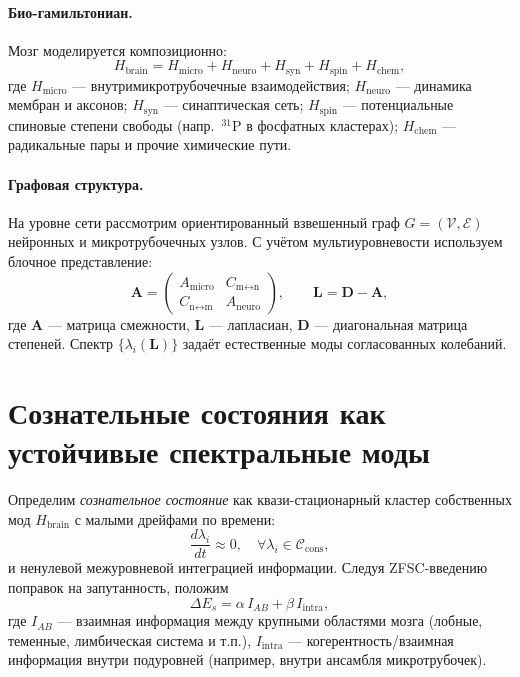 \documentclass[12pt,a4paper]{article}
\begin{document}
\paragraph{Био-гамильтониан.}
Мозг моделируется композиционно:
\begin{equation}
H_{\text{brain}} = H_{\text{micro}} + H_{\text{neuro}} + H_{\text{syn}} + H_{\text{spin}} + H_{\text{chem}},
\end{equation}
где $H_{\text{micro}}$ — внутримикротрубочечные взаимодействия; $H_{\text{neuro}}$ — динамика мембран и аксонов; $H_{\text{syn}}$ — синаптическая сеть; $H_{\text{spin}}$ — потенциальные спиновые степени свободы (напр. \,$^{31}$P в фосфатных кластерах); $H_{\text{chem}}$ — радикальные пары и прочие химические пути.

\paragraph{Графовая структура.}
На уровне сети рассмотрим ориентированный взвешенный граф $G=(\mathcal{V},\mathcal{E})$ нейронных и микротрубочечных узлов. С учётом мультиуровневости используем блочное представление:
\begin{equation}
\bm{A}=
\begin{pmatrix}
A_{\text{micro}} & C_{\text{m}\leftrightarrow \text{n}}\\
C_{\text{n}\leftrightarrow \text{m}} & A_{\text{neuro}}
\end{pmatrix},\qquad
\bm{L}=\bm{D}-\bm{A},
\end{equation}
где $\bm{A}$ — матрица смежности, $\bm{L}$ — лапласиан, $\bm{D}$ — диагональная матрица степеней. Спектр $\{\lambda_i(\bm{L})\}$ задаёт естественные моды согласованных колебаний.

\section{Сознательные состояния как устойчивые спектральные моды}
Определим \emph{сознательное состояние} как квази-стационарный кластер собственных мод $H_{\text{brain}}$ с малыми дрейфами по времени:
\begin{equation}
\frac{d\lambda_i}{dt}\approx 0,\quad \forall \lambda_i \in \mathcal{C}_{\text{cons}},
\end{equation}
и ненулевой межуровневой интеграцией информации. Следуя ZFSC-введению поправок на запутанность, положим
\begin{equation}\label{eq:deltaEs}
\Delta E_s = \alpha\, I_{AB} + \beta\, I_{\text{intra}},
\end{equation}
где $I_{AB}$ — взаимная информация между крупными областями мозга (лобные, теменные, лимбическая система и т.п.), $I_{\text{intra}}$ — когерентность/взаимная информация внутри подуровней (например, внутри ансамбля микротрубочек).
\end{document}
